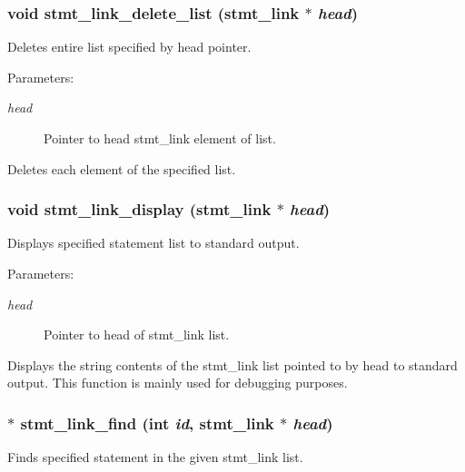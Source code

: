 \subsubsection{\setlength{\rightskip}{0pt plus 5cm}void stmt\_\-link\_\-delete\_\-list ({\bf stmt\_\-link} $\ast$ {\em head})}\label{link_8h_a16}


Deletes entire list specified by head pointer.

\begin{Desc}
\item[Parameters: ]\par
\begin{description}
\item[{\em 
head}]Pointer to head stmt\_\-link element of list.\end{description}
\end{Desc}
Deletes each element of the specified list. 
\subsubsection{\setlength{\rightskip}{0pt plus 5cm}void stmt\_\-link\_\-display ({\bf stmt\_\-link} $\ast$ {\em head})}\label{link_8h_a6}


Displays specified statement list to standard output.

\begin{Desc}
\item[Parameters: ]\par
\begin{description}
\item[{\em 
head}]Pointer to head of stmt\_\-link list.\end{description}
\end{Desc}
Displays the string contents of the stmt\_\-link list pointed to by head to standard output. This function is mainly used for debugging purposes. 
\subsubsection{$\ast$ stmt\_\-link\_\-find (int {\em id}, {\bf stmt\_\-link} $\ast$ {\em head})}\label{link_8h_a11}


Finds specified statement in the given stmt\_\-link list.

